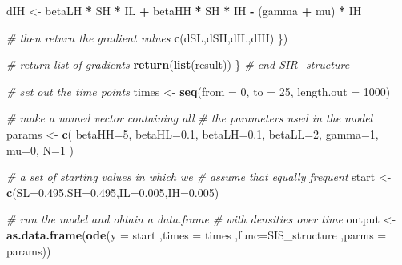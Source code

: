 \documentclass[
]{book}
\newenvironment{Shaded}{\begin{snugshade}}{\end{snugshade}}
\newcommand{\AttributeTok}[1]{\textcolor[rgb]{0.13,0.29,0.53}{#1}}
\newcommand{\CommentTok}[1]{\textcolor[rgb]{0.56,0.35,0.01}{\textit{#1}}}
\newcommand{\DecValTok}[1]{\textcolor[rgb]{0.00,0.00,0.81}{#1}}
\newcommand{\FloatTok}[1]{\textcolor[rgb]{0.00,0.00,0.81}{#1}}
\newcommand{\FunctionTok}[1]{\textcolor[rgb]{0.13,0.29,0.53}{\textbf{#1}}}
\newcommand{\NormalTok}[1]{#1}
\newcommand{\OtherTok}[1]{\textcolor[rgb]{0.56,0.35,0.01}{#1}}
\newcommand{\SpecialCharTok}[1]{\textcolor[rgb]{0.81,0.36,0.00}{\textbf{#1}}}
\theoremstyle{definition}
\theoremstyle{definition}
\theoremstyle{definition}
\theoremstyle{definition}
\theoremstyle{remark}
\begin{document}
\begin{Shaded}
\begin{Highlighting}[]
\NormalTok{        dIH }\OtherTok{\textless{}{-}}\NormalTok{ betaLH }\SpecialCharTok{*}\NormalTok{ SH }\SpecialCharTok{*}\NormalTok{ IL }\SpecialCharTok{+}\NormalTok{ betaHH }\SpecialCharTok{*}\NormalTok{ SH }\SpecialCharTok{*}\NormalTok{ IH }\SpecialCharTok{{-}}\NormalTok{ (gamma  }\SpecialCharTok{+}\NormalTok{ mu) }\SpecialCharTok{*}\NormalTok{ IH}
       
        \CommentTok{\# then return the gradient values}
        \FunctionTok{c}\NormalTok{(dSL,dSH,dIL,dIH)}
\NormalTok{    \})}
    
    \CommentTok{\# return list of gradients }
    \FunctionTok{return}\NormalTok{(}\FunctionTok{list}\NormalTok{(result))}
\NormalTok{\} }\CommentTok{\# end SIR\_structure}

\CommentTok{\# set out the time points }
\NormalTok{times }\OtherTok{\textless{}{-}} \FunctionTok{seq}\NormalTok{(}\AttributeTok{from =} \DecValTok{0}\NormalTok{, }\AttributeTok{to =} \DecValTok{25}\NormalTok{, }\AttributeTok{length.out =} \DecValTok{1000}\NormalTok{)}

\CommentTok{\# make a named vector containing all }
\CommentTok{\# the parameters used in the model}
\NormalTok{params }\OtherTok{\textless{}{-}} \FunctionTok{c}\NormalTok{(}
    \AttributeTok{betaHH=}\DecValTok{5}\NormalTok{,}
    \AttributeTok{betaHL=}\FloatTok{0.1}\NormalTok{,}
    \AttributeTok{betaLH=}\FloatTok{0.1}\NormalTok{,}
    \AttributeTok{betaLL=}\DecValTok{2}\NormalTok{,}
    \AttributeTok{gamma=}\DecValTok{1}\NormalTok{,}
    \AttributeTok{mu=}\DecValTok{0}\NormalTok{,}
    \AttributeTok{N=}\DecValTok{1}
\NormalTok{)}

\CommentTok{\# a set of starting values in which we}
\CommentTok{\# assume that equally frequent}
\NormalTok{start }\OtherTok{\textless{}{-}} \FunctionTok{c}\NormalTok{(}\AttributeTok{SL=}\FloatTok{0.495}\NormalTok{,}\AttributeTok{SH=}\FloatTok{0.495}\NormalTok{,}\AttributeTok{IL=}\FloatTok{0.005}\NormalTok{,}\AttributeTok{IH=}\FloatTok{0.005}\NormalTok{)}

\CommentTok{\# run the model and obtain a data.frame}
\CommentTok{\# with densities over time}
\NormalTok{output }\OtherTok{\textless{}{-}} \FunctionTok{as.data.frame}\NormalTok{(}\FunctionTok{ode}\NormalTok{(}\AttributeTok{y =}\NormalTok{ start}
\NormalTok{              ,}\AttributeTok{times =}\NormalTok{ times}
\NormalTok{              ,}\AttributeTok{func=}\NormalTok{SIS\_structure}
\NormalTok{              ,}\AttributeTok{parms =}\NormalTok{ params))}
\end{Highlighting}
\end{Shaded}
\end{document}
